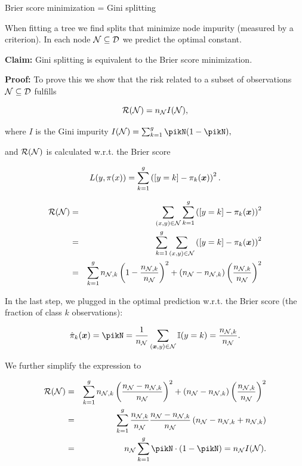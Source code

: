 \begin{vbframe}{Brier score minimization = Gini splitting}

When fitting a tree we find splits that minimize node impurity (measured by a criterion). In each node $\mathcal{N} \subseteq \mathcal{D}$ we predict the optimal constant. 

\vspace*{0.2cm}

\textbf{Claim:} Gini splitting is equivalent to the Brier score minimization. 

\vspace*{0.2cm}

\textbf{Proof: } To prove this we show that the risk related to a subset of observations $\mathcal{N} \subseteq \mathcal{D}$ fulfills 


$$
  \mathcal{R}(\mathcal{N}) = n_{\mathcal{N}} I(\mathcal{N}),
$$
  
  where $I$ is the Gini impurity $I(\Np) = \sum_{k=1}^g \pikN(1-\pikN),$

and $\mathcal{R}(\mathcal{N})$ is calculated w.r.t. the Brier score

$$
  L(y, \pi(x)) = \sum_{k = 1}^g \left([y = k] - \pi_k(\bm{x})\right)^2.
$$

\framebreak


\begin{eqnarray*}
\mathcal{R}(\mathcal{N}) &=& \sum_{(x, y) \in \mathcal{N}}  \sum_{k = 1}^g \left([y = k] - \pi_k(\bm{x})\right)^2 \\
&=& \sum_{k = 1}^g \sum_{(x, y) \in \mathcal{N}}   \left([y = k] - \pi_k(\bm{x})\right)^2 \\
&=& \sum_{k = 1}^g n_{\mathcal{N},k}\left(1 - \frac{n_{\mathcal{N},k}}{n_{\mathcal{N} }}\right)^2 + (n_{\mathcal{N} } - n_{\mathcal{N},k})\left(\frac{n_{\mathcal{N},k}}{n_{\mathcal{N} }}\right)^2
\end{eqnarray*}


In the last step, we plugged in the optimal prediction w.r.t. the Brier score (the fraction of class $k$ observations):

$$\hat \pi_k(\xv)= \pikN = \frac{1}{n_{\Np}} \sum\limits_{(\xv,y) \in \Np} \I(y = k) = \frac{n_{\Np,k}}{n_{\Np }}.$$ 


We further simplify the expression to

\begin{eqnarray*}
\risk(\Np) &=&  \sum_{k = 1}^g n_{\Np,k}\left(\frac{n_{\Np } - n_{\Np,k}}{n_{\Np }}\right)^2 + (n_{\Np } - n_{\Np,k})\left(\frac{n_{\Np,k}}{n_{\Np }}\right)^2 \\
&=& \sum_{k = 1}^g \frac{n_{\Np,k}}{n_{\Np }} \frac{n_{\Np } - n_{\Np,k}}{n_{\Np }} \left(n_{\Np } - n_{\Np,k } + n_{\Np,k}\right) \\
&=& n_{\Np } \sum_{k = 1}^g \pikN \cdot (1 - \pikN) = n_\Np I(\Np).
\end{eqnarray*}

\end{vbframe}


\endlecture

